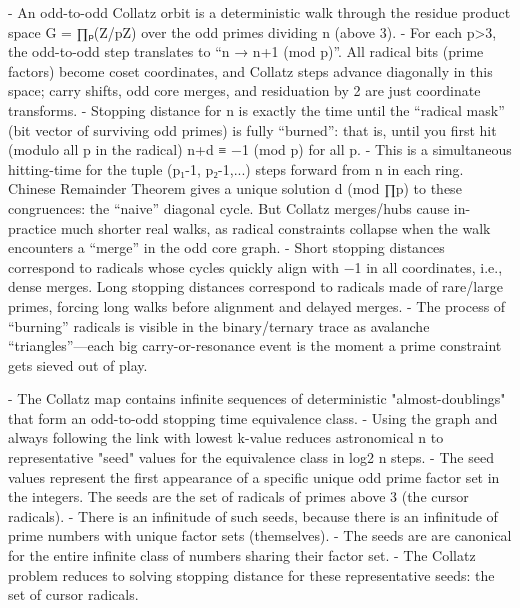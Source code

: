 \documentclass[12pt]{article}
\theoremstyle{plain}
\theoremstyle{definition}
\begin{document}
- An odd-to-odd Collatz orbit is a deterministic walk through the residue product space G = ∏ₚ(Z/pZ) over the odd primes dividing n (above 3).
- For each p>3, the odd-to-odd step translates to “n → n+1 (mod p)”. All radical bits (prime factors) become coset coordinates, and Collatz steps advance diagonally in this space; carry shifts, odd core merges, and residuation by 2 are just coordinate transforms.
- Stopping distance for n is exactly the time until the “radical mask” (bit vector of surviving odd primes) is fully “burned”: that is, until you first hit (modulo all p in the radical) n+d ≡ −1 (mod p) for all p.
- This is a simultaneous hitting-time for the tuple (p₁-1, p₂-1,...) steps forward from n in each ring. Chinese Remainder Theorem gives a unique solution d (mod ∏p) to these congruences: the “naive” diagonal cycle. But Collatz merges/hubs cause in-practice much shorter real walks, as radical constraints collapse when the walk encounters a “merge” in the odd core graph.
- Short stopping distances correspond to radicals whose cycles quickly align with −1 in all coordinates, i.e., dense merges. Long stopping distances correspond to radicals made of rare/large primes, forcing long walks before alignment and delayed merges.
- The process of “burning” radicals is visible in the binary/ternary trace as avalanche “triangles”—each big carry-or-resonance event is the moment a prime constraint gets sieved out of play.

- The Collatz map contains infinite sequences of deterministic "almost-doublings" that form an odd-to-odd stopping time equivalence class.
- Using the graph and always following the link with lowest k-value reduces astronomical n to representative "seed" values for the equivalence class in log2 n steps.
- The seed values represent the first appearance of a specific unique odd prime factor set in the integers. The seeds are the set of radicals of primes above 3 (the cursor radicals).
- There is an infinitude of such seeds, because there is an infinitude of prime numbers with unique factor sets (themselves).
- The seeds are are canonical for the entire infinite class of numbers sharing their factor set.
- The Collatz problem reduces to solving stopping distance for these representative seeds: the set of cursor radicals.
\end{document}
